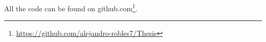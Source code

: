 \documentclass[12pt]{article}
\begin{document}
All the code can be found on github.com\footnote{\url{https://github.com/alejandro-robles7/Thesis}}.

\renewcommand{\thepage}{\roman{page}}
\setcounter{page}{2}

\newpage

\renewcommand\contentsname{\begin{center}
TABLE OF CONTENTS
\end{center}
}
\setcounter{tocdepth}{1}

\tableofcontents
{}









\newpage
\renewcommand\listtablename{\begin{center}LIST OF TABLES\end{center}}
\listoftables

\newpage
\renewcommand\listfigurename{\begin{center}LIST OF FIGURES\end{center}}
\listoffigures



\newpage

\renewcommand{\thepage}{\arabic{page}}
\setcounter{page}{1}

\end{document}
